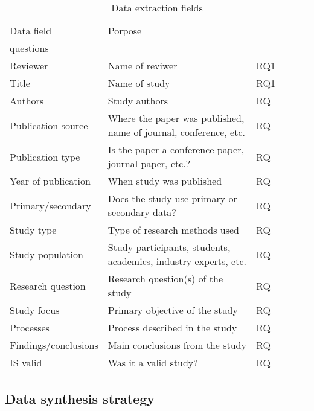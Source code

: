 \begin{table}[ht]
\begin{tabularx}{.9\textwidth}{lXlXlX}
\hline
Data field & Porpose & \begin{tabular}[c]{@{}l@{}}Research \\ questions\end{tabular} \\ \hline
Reviewer & Name of reviwer & RQ1 \\
Title & Name of study & RQ1 \\
Authors & Study authors & RQ \\
Publication source & Where the paper was published, name of journal, conference, etc. & RQ \\
Publication type & Is the paper a conference paper, journal paper, etc.? & RQ \\
Year of publication & When study was published & RQ \\
Primary/secondary & Does the study use primary or secondary data? & RQ \\
Study type & Type of research methods used & RQ \\
Study population & Study participants, students, academics, industry experts, etc. & RQ \\
Research question & Research question(s) of the study & RQ \\
Study focus & Primary objective of the study & RQ \\
Processes & Process described in the study & RQ \\
Findings/conclusions & Main conclusions from the study & RQ \\
IS valid & Was it a valid study? & RQ \\ \hline
\end{tabularx}%
\caption{Data extraction fields}
\label{tab:DataExtractionFields}
\end{table}

\subsection{Data synthesis strategy}
\label{subsec:DataSynthesis}
